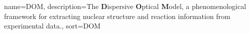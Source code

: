 \makeglossaries

{
    name=DOM,
    description={The \textbf{D}ispersive \textbf{O}ptical \textbf{M}odel, a phenomenological
framework for extracting nuclear structure and reaction information from experimental data.},
    sort={DOM}
}
